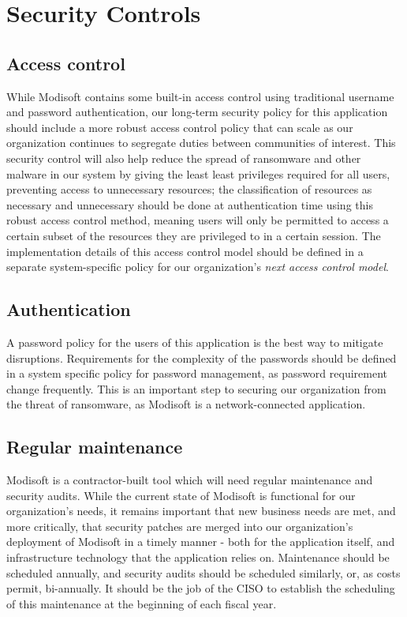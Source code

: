 \documentclass[11pt]{article}
\begin{document}
\section{Security Controls}
\label{sec:org77391b2}
\subsection{Access control}
\label{sec:orge529802}
While Modisoft contains some built-in access control using traditional username and password authentication, our long-term security policy for this application should include a more robust access control policy that can scale as our organization continues to segregate duties between communities of interest. This security control will also help reduce the spread of ransomware and other malware in our system by giving the least least privileges required for all users, preventing access to unnecessary resources; the classification of resources as necessary and unnecessary should be done at authentication time using this robust access control method, meaning users will only be permitted to access a certain subset of the resources they are privileged to in a certain session. The implementation details of this access control model should be defined in a separate system-specific policy for our organization's \emph{next access control model}.

\subsection{Authentication}
\label{sec:orgb0cd8de}
A password policy for the users of this application is the best way to mitigate disruptions. Requirements for the complexity of the passwords should be defined in a system specific policy for password management, as password requirement change frequently. This is an important step to securing our organization from the threat of ransomware, as Modisoft is a network-connected application.

\subsection{Regular maintenance}
\label{sec:org532605a}
Modisoft is a contractor-built tool which will need regular maintenance and security audits. While the current state of Modisoft is functional for our organization's needs, it remains important that new business needs are met, and more critically, that security patches are merged into our organization's deployment of Modisoft in a timely manner - both for the application itself, and infrastructure technology that the application relies on. Maintenance should be scheduled annually, and security audits should be scheduled similarly, or, as costs permit, bi-annually. It should be the job of the CISO to establish the scheduling of this maintenance at the beginning of each fiscal year.
\end{document}
